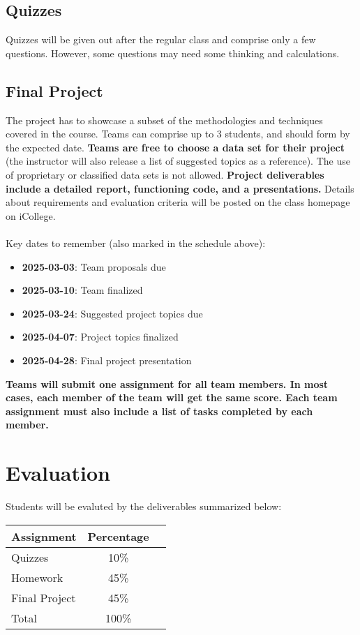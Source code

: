 \documentclass[a4paper, 12pt]{article}
\begin{document}
\subsection{Quizzes}
Quizzes will be given out after the regular class and comprise only a few questions. However, some questions may need some thinking and calculations.

\subsection{Final Project}
The project has to showcase a subset of the methodologies and techniques covered in the course. Teams can comprise up to 3 students, and should form by the expected date. \textbf{Teams are free to choose a data set for their project} (the instructor will also release a list of suggested topics as a reference). The use of proprietary or classiﬁed data sets is not allowed. \textbf{Project deliverables include a detailed report, functioning code, and a presentations.} Details about requirements and evaluation criteria will be posted on the class homepage on iCollege.\\
\\
Key dates to remember (also marked in the schedule above):\\
\begin{itemize}
  \item \textbf{2025-03-03}: Team proposals due
  \item \textbf{2025-03-10}: Team finalized
  \item \textbf{2025-03-24}: Suggested project topics due
  \item \textbf{2025-04-07}: Project topics finalized
  \item \textbf{2025-04-28}: Final project presentation
\end{itemize}

\begin{flushleft}
	\textbf{Teams will submit one assignment for all team members. In most cases, each member of the team will get the same score. Each team assignment must also include a list of tasks completed by each member.}
\end{flushleft}

\section{Evaluation}
Students will be evaluted by the deliverables summarized below:\\
\begin{center}
	\begin{tabular}{lcr}
		\hline
		Assignment & Percentage \\
		\hline
		Quizzes & 10\%\\
		Homework & 45\%\\
		Final Project & 45\%\\
		\hline
		Total & 100\%\\   
		\hline     
	\end{tabular}
\end{center}
\end{document}
